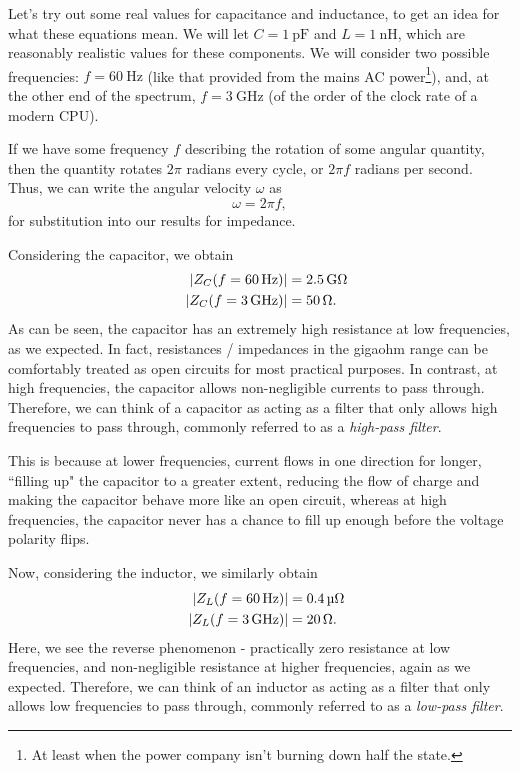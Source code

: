 \documentclass[letterpaper]{article}
\theoremstyle{remark}
\DeclarePairedDelimiter\abs{\lvert}{\rvert}%
\newcommand{\eqn}[1]{\begin{alignat*}{2}#1\end{alignat*}}
\begin{document}
Let's try out some real values for capacitance and inductance, to get an idea for what these equations mean. We will let $C = \SI{1}{\pico\farad}$ and $L = \SI{1}{\nano\henry}$, which are reasonably realistic values for these components. We will consider two possible frequencies: $f = \SI{60}{\hertz}$ (like that provided from the mains AC power\footnote{At least when the power company isn't burning down half the state.}), and, at the other end of the spectrum, $f = \SI{3}{\giga\hertz}$ (of the order of the clock rate of a modern CPU).

If we have some frequency $f$ describing the rotation of some angular quantity, then the quantity rotates $2\pi$ radians every cycle, or $2\pi f$ radians per second. Thus, we can write the angular velocity $\omega$ as
\[
    \omega = 2\pi f,
\]
for substitution into our results for impedance.

Considering the capacitor, we obtain
\eqn{
    && \abs{Z_C(f = \SI{60}{\hertz})} &= \SI{2.5}{\giga\ohm} \\
    && \abs{Z_C(f = \SI{3}{\giga\hertz})} &= \SI{50}{\ohm}.
}
As can be seen, the capacitor has an extremely high resistance at low frequencies, as we expected. In fact, resistances / impedances in the gigaohm range can be comfortably treated as open circuits for most practical purposes. In contrast, at high frequencies, the capacitor allows non-negligible currents to pass through. Therefore, we can think of a capacitor as acting as a filter that only allows high frequencies to pass through, commonly referred to as a \emph{high-pass filter}. 

This is because at lower frequencies, current flows in one direction for longer, ``filling up" the capacitor to a greater extent, reducing the flow of charge and making the capacitor behave more like an open circuit, whereas at high frequencies, the capacitor never has a chance to fill up enough before the voltage polarity flips. 

Now, considering the inductor, we similarly obtain
\eqn{
    && \abs{Z_L(f = \SI{60}{\hertz})} &= \SI{0.4}{\micro\ohm} \\
    && \abs{Z_L(f = \SI{3}{\giga\hertz})} &= \SI{20}{\ohm}.
}
Here, we see the reverse phenomenon - practically zero resistance at low frequencies, and non-negligible resistance at higher frequencies, again as we expected. Therefore, we can think of an inductor as acting as a filter that only allows low frequencies to pass through, commonly referred to as a \emph{low-pass filter}. 
\end{document}
